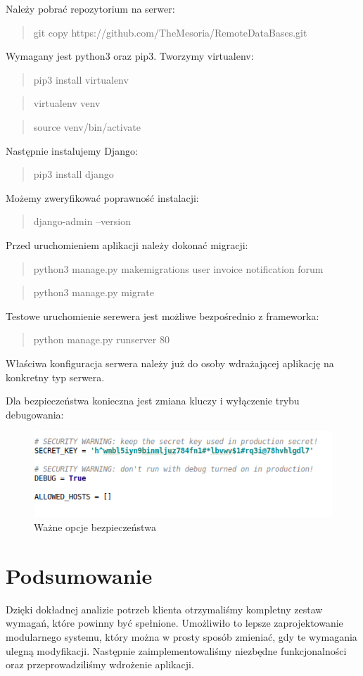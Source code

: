 \documentclass[12pt]{article}
\begin{document}
	Należy pobrać repozytorium na serwer:
	\begin{quote}
		git copy https://github.com/TheMesoria/RemoteDataBases.git
	\end{quote}
	Wymagany jest python3 oraz pip3. Tworzymy virtualenv:
	\begin{quote}pip3 install virtualenv\end{quote}
	\begin{quote}virtualenv venv\end{quote}
	\begin{quote}source venv/bin/activate\end{quote}
	Następnie instalujemy Django:
	\begin{quote}pip3 install django\end{quote}
	Możemy zweryfikować poprawność instalacji:
	\begin{quote}django-admin --version\end{quote}
	Przed uruchomieniem aplikacji należy dokonać migracji:
	\begin{quote}python3 manage.py makemigrations user invoice notification forum\end{quote}
	\begin{quote}python3 manage.py migrate\end{quote}
	Testowe uruchomienie serewera jest możliwe bezpośrednio z frameworka:
	\begin{quote}python manage.py runserver 80\end{quote}
	Właściwa konfiguracja serwera należy już do osoby wdrażającej aplikację na konkretny typ serwera.
	
	Dla bezpieczeństwa konieczna jest zmiana kluczy i wyłączenie trybu debugowania:
	\begin{figure}[H]
		\centering
		\includegraphics[scale=0.7]{img/c_security.png}
		\caption{Ważne opcje bezpieczeństwa}
	\end{figure}
	\newpage
	\section{Podsumowanie}
	Dzięki dokładnej analizie potrzeb klienta otrzymaliśmy kompletny zestaw wymagań, które powinny być spełnione. Umożliwiło to lepsze zaprojektowanie modularnego systemu, który można w prosty sposób zmieniać, gdy te wymagania ulegną modyfikacji. Następnie zaimplementowaliśmy niezbędne funkcjonalności oraz przeprowadziliśmy wdrożenie aplikacji.
	
\end{document}
